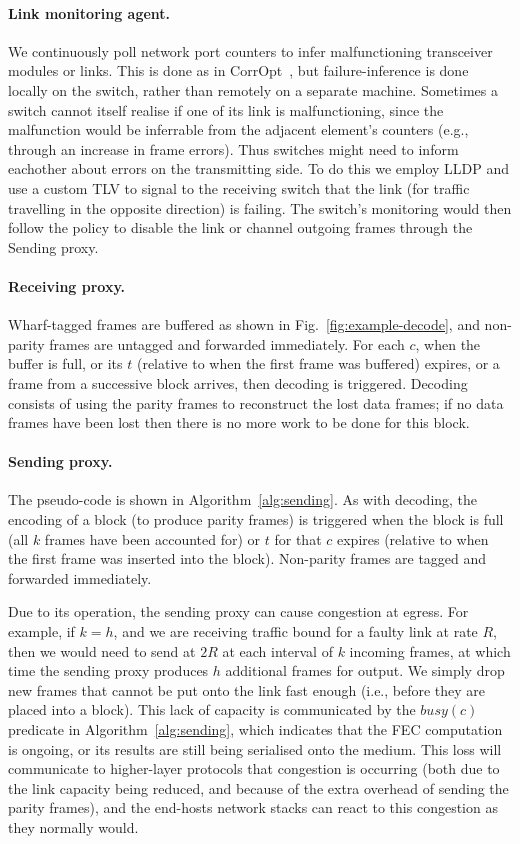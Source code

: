 \documentclass[sigconf]{acmart}
\newcommand{\OurSys}{Wharf\xspace}
\begin{document}
\paragraph{Link monitoring agent.}
  We continuously poll network port counters to infer malfunctioning transceiver
  modules or links. This is done as in
  CorrOpt~\cite{Zhuo:2017:UMP:3098822.3098849}, but failure-inference is done
  locally on the switch, rather than remotely on a separate machine.
  Sometimes a switch cannot itself realise if one of its link is
  malfunctioning, since the malfunction would be inferrable from the adjacent
  element's counters (e.g., through an increase in frame errors). Thus switches
  might need to inform eachother about errors on the transmitting side. To do
  this we employ LLDP and use a custom TLV to signal to the receiving switch
  that the link (for traffic travelling in the opposite direction) is failing.
  The switch's monitoring would then follow the policy to disable the link or
  channel outgoing frames through the Sending proxy.


\paragraph{Receiving proxy.}
\OurSys-tagged frames are buffered as shown in Fig.~\ref{fig:example-decode},
and non-parity frames are untagged and forwarded immediately.
For each $c$, when the buffer is full, or its $t$ (relative to when the first
frame was buffered) expires, or a frame from a successive block arrives, then
decoding is triggered. Decoding consists of using the parity frames to
reconstruct the lost data frames; if no data frames have been lost then there
is no more work to be done for this block.

\paragraph{Sending proxy.}
The pseudo-code is shown in Algorithm~\ref{alg:sending}.
As with decoding, the encoding of a block (to produce parity frames) is
triggered when the block is full (all $k$ frames have been accounted for) or
$t$ for that $c$ expires (relative to when the first frame was inserted into
the block). Non-parity frames are tagged and forwarded immediately.

Due to its operation, the sending proxy can cause congestion at egress.
For example, if $k = h$, and we are receiving traffic bound for
a faulty link at rate $R$, then we would need to send at $2R$ at each interval
of $k$ incoming frames, at which time the sending proxy produces $h$ additional
frames for output. We simply drop new frames that cannot be put onto the link
fast enough (i.e., before they are placed into a block). This lack of capacity
is communicated by the $\mathit{busy}(c)$ predicate in
Algorithm~\ref{alg:sending}, which indicates that the FEC computation is
ongoing, or its results are still being serialised onto the medium. This loss
will communicate to higher-layer protocols that congestion is occurring (both
due to the link capacity being reduced, and because of the extra overhead of
sending the parity frames), and the end-hosts network stacks can react to this
congestion as they normally would.
\end{document}
